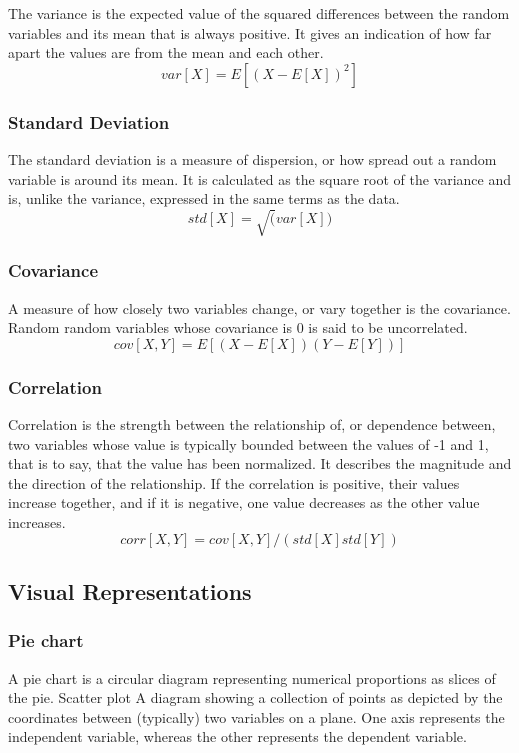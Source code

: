 \documentclass[]{article}
\begin{document}
The variance is the expected value of the squared differences between
the random variables and its mean that is always positive. It gives an
indication of how far apart the values are from the mean and each other.
\[ var[X] = E[(X - E[X])^2] \]

\subsubsection{Standard Deviation}\label{standard-deviation}

The standard deviation is a measure of dispersion, or how spread out a
random variable is around its mean. It is calculated as the square root
of the variance and is, unlike the variance, expressed in the same terms
as the data. \[ std[X] = \sqrt(var[X]) \]

\subsubsection{Covariance}\label{covariance}

A measure of how closely two variables change, or vary together is the
covariance. Random random variables whose covariance is 0 is said to be
uncorrelated. \[ cov[X,Y] = E[(X - E[X])(Y-E[Y])] \]

\subsubsection{Correlation}\label{correlation}

Correlation is the strength between the relationship of, or dependence
between, two variables whose value is typically bounded between the
values of -1 and 1, that is to say, that the value has been normalized.
It describes the magnitude and the direction of the relationship. If the
correlation is positive, their values increase together, and if it is
negative, one value decreases as the other value increases.
\[ corr[X,Y] = cov[X,Y] / (std[X]std[Y]) \]

\subsection{Visual Representations}\label{visual-representations}

\subsubsection{Pie chart}\label{pie-chart}

A pie chart is a circular diagram representing numerical proportions as
slices of the pie. Scatter plot A diagram showing a collection of points
as depicted by the coordinates between (typically) two variables on a
plane. One axis represents the independent variable, whereas the other
represents the dependent variable.
\end{document}
